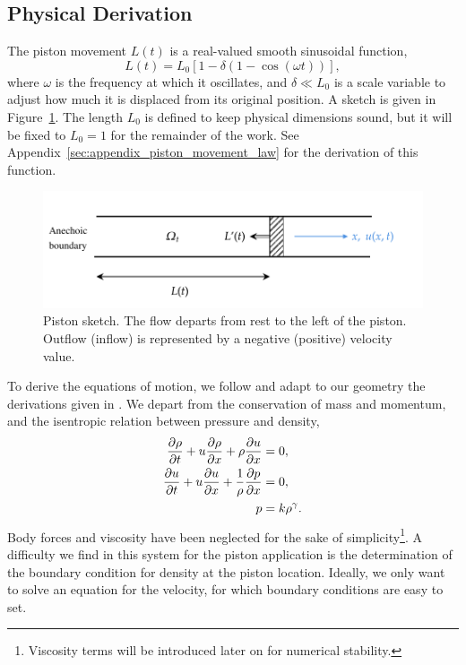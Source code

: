 \documentclass[../../thesis.tex]{subfiles}
\begin{document}
\subsection{Physical Derivation}
The piston movement $L(t)$ is a real-valued smooth sinusoidal function,
\begin{equation}
    L(t) = L_0 \left[1 - \delta \left(1 - \cos \left(\omega t\right)\right)\right],
\end{equation}
where $\omega$ is the frequency at which it oscillates, 
and $\delta \ll L_0$ is a scale variable to adjust how much it is displaced from its original position. 
A sketch is given in Figure~\ref{fig:piston}.
The length $L_0$ is defined to keep physical dimensions sound, 
but it will be fixed to $L_0=1$ for the remainder of the work.
See Appendix~\ref{sec:appendix_piston_movement_law} for the derivation of this function.
\begin{figure}[h]
    \includegraphics[width=1.0\columnwidth]{research_project/piston/figures/piston.pdf}
    \caption{Piston sketch. The flow departs from rest to the left of the piston.
    Outflow (inflow) is represented by a negative (positive) velocity value.}
    \label{fig:piston}
\end{figure}

To derive the equations of motion, 
we follow and adapt to our geometry the derivations given in \cite{nonlinearDiffusiveWaves}. 
We depart from the conservation of mass and momentum, and the isentropic relation between pressure and density,
\begin{subequations}
\begin{align}
    \pdv{\rho}{t} + u \pdv{\rho}{x} + \rho \pdv{u}{x} &= 0, \\ 
    \pdv{u}{t} + u \pdv{u}{x} + \frac{1}{\rho}\pdv{p}{x} &= 0, \\
    p &= k \rho^{\gamma} \label{eq:isentropic_relation}. 
\end{align}
\end{subequations}
Body forces and viscosity have been neglected for the sake of simplicity\footnote{Viscosity terms will be introduced later on for numerical stability.}.
A difficulty we find in this system for the piston application is the determination of the boundary condition for density at the piston location.
Ideally, we only want to solve an equation for the velocity, for which boundary conditions are easy to set.
\end{document}
